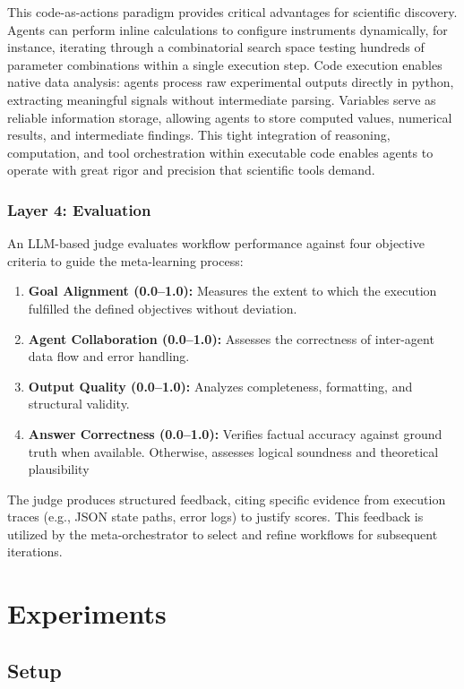 \documentclass{article}
\begin{document}
This code-as-actions paradigm provides critical advantages for scientific discovery. Agents can perform inline calculations to configure instruments dynamically, for instance, iterating through a combinatorial search space testing hundreds of parameter combinations within a single execution step. Code execution enables native data analysis: agents process raw experimental outputs directly in python, extracting meaningful signals without intermediate parsing. Variables serve as reliable information storage, allowing agents to store computed values, numerical results, and intermediate findings.
This tight integration of reasoning, computation, and tool orchestration within executable code enables agents to operate with great rigor and precision that scientific tools demand.


\subsubsection{Layer 4: Evaluation}

An LLM-based judge evaluates workflow performance against four objective criteria to guide the meta-learning process:
\begin{enumerate}
    \item \textbf{Goal Alignment (0.0--1.0):} Measures the extent to which the execution fulfilled the defined objectives without deviation.
    \item \textbf{Agent Collaboration (0.0--1.0):} Assesses the correctness of inter-agent data flow and error handling.
    \item \textbf{Output Quality (0.0--1.0):} Analyzes completeness, formatting, and structural validity.
    \item \textbf{Answer Correctness (0.0--1.0):} Verifies factual accuracy against ground truth when available. Otherwise, assesses logical soundness and theoretical plausibility
\end{enumerate}

The judge produces structured feedback, citing specific evidence from execution traces (e.g., JSON state paths, error logs) to justify scores. This feedback is utilized by the meta-orchestrator to select and refine workflows for subsequent iterations.

\section{Experiments}

\subsection{Setup}
\end{document}
